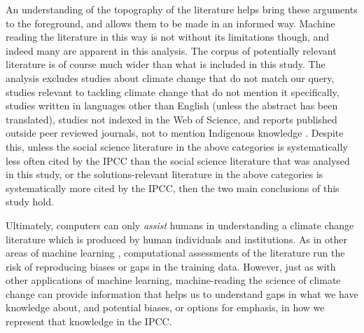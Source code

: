 \documentclass{article}
\begin{document}
\begin{linenumbers}
An understanding of the topography of the literature helps bring these arguments to the foreground, and allows them to be made in an informed way. Machine reading the literature in this way is not without its limitations though, and indeed many are apparent in this analysis. The corpus of potentially relevant literature is of course much wider than what is included in this study. The analysis excludes studies about climate change that do not match our query, studies relevant to tackling climate change that do not mention it specifically, studies written in languages other than English (unless the abstract has been translated), studies not indexed in the Web of Science, and reports published outside peer reviewed journals, not to mention Indigenous knowledge \cite{Ford2016b}. Despite this, unless the social science literature in the above categories is systematically less often cited by the IPCC than the social science literature that was analysed in this study, or the solutions-relevant literature in the above categories is systematically more cited by the IPCC, then the two main conclusions of this study hold. 

Ultimately, computers can only \textit{assist} humans in understanding a climate change literature which is produced by human individuals and institutions.  As in other areas of machine learning \cite{Barocas2016}, computational assessments of the literature run the risk of reproducing biases or gaps in the training data. However, just as with other applications of machine learning, machine-reading the science of climate change can provide information that helps us to understand gaps in what we have knowledge about, and potential biases, or options for emphasis, in how we represent that knowledge in the IPCC. %

\end{linenumbers}

\appendix
\end{document}
